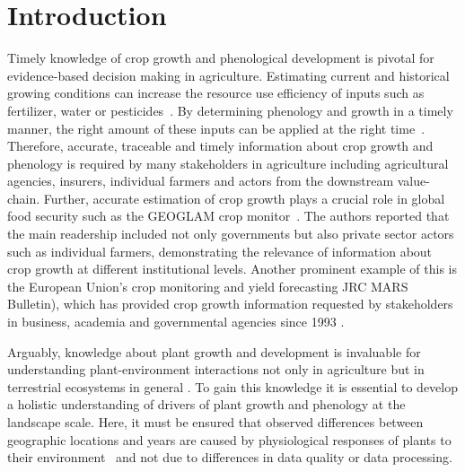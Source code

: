 \section{Introduction}
\label{sec:introduction}
Timely knowledge of crop growth and phenological development is pivotal for evidence-based decision making in agriculture. Estimating current and historical growing conditions can increase the resource use efficiency of inputs such as fertilizer, water or pesticides~\citep{bach_sustainable_2018}. By determining phenology and growth in a timely manner, the right amount of these inputs can be applied at the right time~\citep{pedersen_precision_2017,argento_site-specific_2021}. Therefore, accurate, traceable and timely information about crop growth and phenology is required by many stakeholders in agriculture including agricultural agencies, insurers, individual farmers and actors from the downstream value-chain. Further, accurate estimation of crop growth plays a crucial role in global food security such as the GEOGLAM crop monitor~\citep{becker-reshef_strengthening_2020}. The authors reported that the main readership included not only governments but also private sector actors such as individual farmers, demonstrating the relevance of information about crop growth at different institutional levels. Another prominent example of this is the European Union's crop monitoring and yield forecasting JRC MARS Bulletin), which has provided crop growth information requested by stakeholders in business, academia and governmental agencies since 1993 \citep{van_der_velde_use_2019}.

Arguably, knowledge about plant growth and development is invaluable for understanding plant-environment interactions not only in agriculture but in terrestrial ecosystems in general \citep{zhu_greening_2016}.
To gain this knowledge it is essential to develop a holistic understanding of drivers of plant growth and phenology at the landscape scale. Here, it must be ensured that observed differences between geographic locations and years are caused by physiological responses of plants to their environment~\citep{korner_tools_2021} and not due to differences in data quality or data processing.

